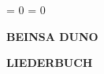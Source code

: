 \documentclass[11pt,a5paper,twoside]{article}
\begin{document}
	
	\clubpenalty = 0
	\widowpenalty = 0



%
\let\cleardoublepage\clearpage


\begin{titlepage}

\begin{center}
{\large \textbf{BEINSA DUNO}}

\vspace*{0.3cm}

{\large \textbf{LIEDERBUCH}}


\end{center}


\end{titlepage}

\newpage\thispagestyle{empty}~ %
\newpage %
\thispagestyle{empty}



 \newpage
































\end{document}
